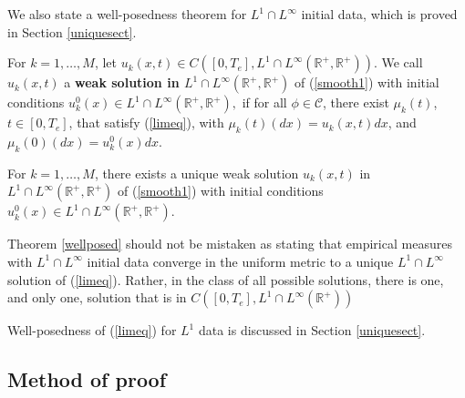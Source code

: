 We also state a well-posedness theorem for $L^1\cap L^\infty$ initial data, which is proved in Section \ref{uniquesect}.

\begin{deef}
For $k = 1, \dots, M$, let $u_{k}(x,t) \in C([0,T_e],L^1\cap L^\infty(\mathbb{R}^+,\mathbb{R}^+))$. We call $u_{k}(x,t)$ a \textbf{weak solution in $L^1\cap L^\infty(\mathbb{R}^+,\mathbb{R}^+)$} of  (\ref{smooth1}) with initial conditions $u_k^0(x) \in L^1\cap L^\infty(\mathbb{R}^+,\mathbb{R}^+),$ if for all $\phi\in \mathcal C$, there exist $\mu_k(t)$, $t\in [0,T_e]$, that satisfy (\ref{limeq}), with $\mu_k(t)(dx) = u_{k}(x,t)dx$, and $\mu_k(0)(dx) = u_{k}^0(x)dx$.   
\end{deef}

\begin{theorem}\label{wellposed} For $k = 1, \dots, M$,  there exists a unique   weak solution $u_{k}(x,t)$ in $L^1\cap L^\infty(\mathbb{R}^+,\mathbb{R}^+)$ of  (\ref{smooth1}) with initial conditions $u_k^0(x) \in L^1\cap L^\infty(\mathbb{R}^+,\mathbb{R}^+)$.
\end{theorem}

\begin{rem}
Theorem \ref{wellposed} should not be mistaken as stating that empirical measures with $L^1\cap L^\infty$ initial data converge in the uniform metric to a unique $L^1\cap L^\infty$ solution of (\ref{limeq}). Rather, in the class of all possible solutions, there is one, and only one, solution that is in $C([0,T_e],L^1\cap L^\infty(\mathbb R^+))$    \end{rem}
 
Well-posedness of  (\ref{limeq}) for $L^1$ data is discussed in Section \ref{uniquesect}.  




\subsection{Method of proof}


